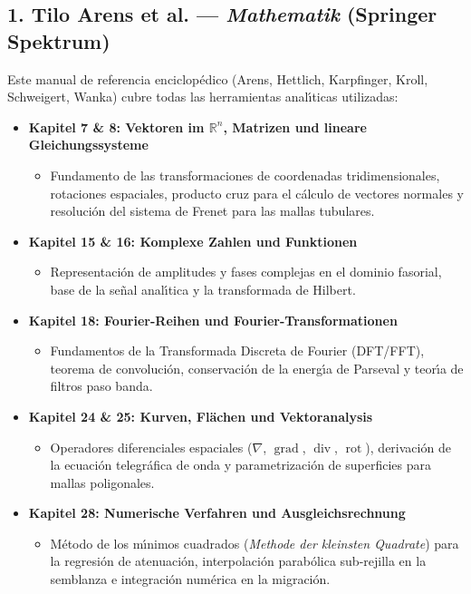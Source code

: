 \documentclass[11pt,a4paper]{article}
\begin{document}
\subsection{1. Tilo Arens et al. --- \textit{Mathematik} (Springer Spektrum)}
Este manual de referencia enciclop{\'e}dico (Arens, Hettlich, Karpfinger, Kroll, Schweigert, Wanka) cubre todas las herramientas anal{\'\i}ticas utilizadas:
\begin{itemize}
    \item \textbf{Kapitel 7 \& 8: Vektoren im $\mathbb{R}^n$, Matrizen und lineare Gleichungssysteme}
    \begin{itemize}
        \item Fundamento de las transformaciones de coordenadas tridimensionales, rotaciones espaciales, producto cruz para el c{\'a}lculo de vectores normales y resoluci{\'o}n del sistema de Frenet para las mallas tubulares.
    \end{itemize}
    \item \textbf{Kapitel 15 \& 16: Komplexe Zahlen und Funktionen}
    \begin{itemize}
        \item Representaci{\'o}n de amplitudes y fases complejas en el dominio fasorial, base de la se{\~n}al anal{\'\i}tica y la transformada de Hilbert.
    \end{itemize}
    \item \textbf{Kapitel 18: Fourier-Reihen und Fourier-Transformationen}
    \begin{itemize}
        \item Fundamentos de la Transformada Discreta de Fourier (DFT/FFT), teorema de convoluci{\'o}n, conservaci{\'o}n de la energ{\'\i}a de Parseval y teor{\'\i}a de filtros paso banda.
    \end{itemize}
    \item \textbf{Kapitel 24 \& 25: Kurven, Fl{\"a}chen und Vektoranalysis}
    \begin{itemize}
        \item Operadores diferenciales espaciales ($\nabla$, $\operatorname{grad}$, $\operatorname{div}$, $\operatorname{rot}$), derivaci{\'o}n de la ecuaci{\'o}n telegr{\'a}fica de onda y parametrizaci{\'o}n de superficies para mallas poligonales.
    \end{itemize}
    \item \textbf{Kapitel 28: Numerische Verfahren und Ausgleichsrechnung}
    \begin{itemize}
        \item M{\'e}todo de los m{\'\i}nimos cuadrados (\textit{Methode der kleinsten Quadrate}) para la regresi{\'o}n de atenuaci{\'o}n, interpolaci{\'o}n parab{\'o}lica sub-rejilla en la semblanza e integraci{\'o}n num{\'e}rica en la migraci{\'o}n.
    \end{itemize}
\end{itemize}
\end{document}

